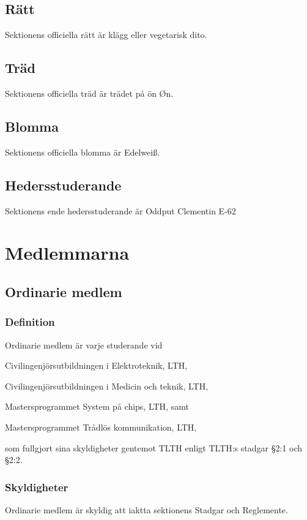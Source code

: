 \documentclass[10pt]{article}
\begin{document}
    \subsection{Rätt}
    Sektionens officiella rätt är klägg eller vegetarisk dito.
    \subsection{Träd}
    Sektionens officiella träd är trädet på ön Øn.
    \subsection{Blomma}
    Sektionens officiella blomma är Edelwei\ss.
    \subsection{Hedersstuderande}
    Sektionens ende hedersstuderande är Oddput Clementin E-62
    \newpage
    
    \section{Medlemmarna}
    \subsection{Ordinarie medlem}
    \subsubsection{Definition}
    Ordinarie medlem är varje studerande vid
    \begin{dashlist}
    \item Civilingenjörsutbildningen i Elektroteknik, LTH,
    \item Civilingenjörsutbildningen i Medicin och teknik, LTH,
    \item Mastersprogrammet System på chips, LTH, samt
    \item Mastersprogrammet Trådlös kommunikation, LTH,
    \end{dashlist}
    som fullgjort sina skyldigheter gentemot TLTH enligt TLTH:s stadgar §2:1 och §2:2.
    
    \subsubsection{Skyldigheter}
    Ordinarie medlem är skyldig att iaktta sektionens
    Stadgar och Reglemente.
    
\end{document}
